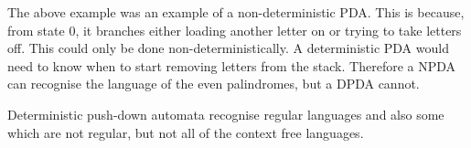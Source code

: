 The above example was an example of a non-deterministic PDA. This is because, from state 0, it branches either loading another letter on or trying to take letters off. This could only be done non-deterministically. A deterministic PDA would need to know when to start removing letters from the stack. Therefore a NPDA can recognise the language of the even palindromes, but a DPDA cannot. 

Deterministic push-down automata recognise regular languages and also some which are not regular, but not all of the context free languages. 